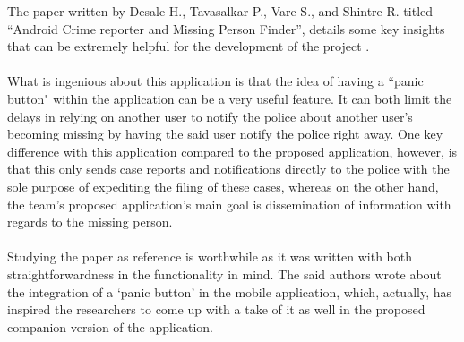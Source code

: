 The paper written by Desale H., Tavasalkar P., Vare S., and Shintre R. titled “Android Crime reporter and Missing Person Finder”, details some key insights that can be extremely helpful for the development of the project \cite{desale2020android}.
\\\\What is ingenious about this application is that the idea of having a “panic button" within the application can be a very useful feature. It can both limit the delays in relying on another user to notify the police about another user's becoming missing by having the said user notify the police right away. One key difference with this application compared to the proposed application, however, is that this only sends case reports and notifications directly to the police with the sole purpose of expediting the filing of these cases, whereas on the other hand, the team’s proposed application’s main goal is dissemination of information with regards to the missing person.
\\\\Studying the paper as reference is worthwhile as it was written with both straightforwardness in the functionality in mind. The said authors wrote about the integration of a ‘panic button’ in the mobile application, which, actually, has inspired the researchers to come up with a take of it as well in the proposed companion version of the application. 

